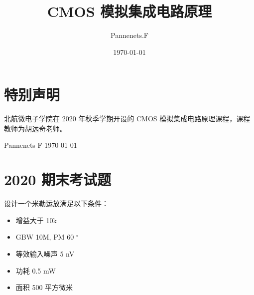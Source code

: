 \documentclass[cn,11pt,chinese,black,simple]{elegantbook}
\title{CMOS 模拟集成电路原理}
\author{Pannenets.F}
\date{\today}
\begin{document}
\maketitle
\frontmatter

\chapter*{特别声明}

北航微电子学院在 2020 年秋季学期开设的 CMOS 模拟集成电路原理课程，课程教师为胡远奇老师。

% 

\begin{flushright}
Pannenets F
\today
\end{flushright}

\tableofcontents

\mainmatter





















\chapter{2020 期末考试题}

设计一个米勒运放满足以下条件：

\begin{itemize}
  \item 增益大于 10k
  \item GBW 10M, PM 60 \(^\circ\)
  \item 等效输入噪声 5 nV 
  \item 功耗 0.5 mW
  \item 面积 500 平方微米
\end{itemize}
\end{document}
